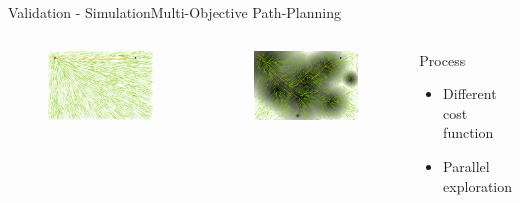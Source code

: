 \begin{frame}{Validation - Simulation}{Multi-Objective Path-Planning}

\begin{columns}
	\begin{figure}
		\centering
		\includegraphics[width=\linewidth]{figure/sim2-2obj/MORRTstar00-0}
	\end{figure}
	\begin{figure}
		\centering
		\includegraphics[width=\linewidth]{figure/sim2-2obj/MORRTstar00-1}
	\end{figure}
\begin{block}{Process}
\begin{itemize}
\item Different cost function
\item Parallel exploration
\end{itemize}
\end{block}		
\end{columns}


\end{frame}
